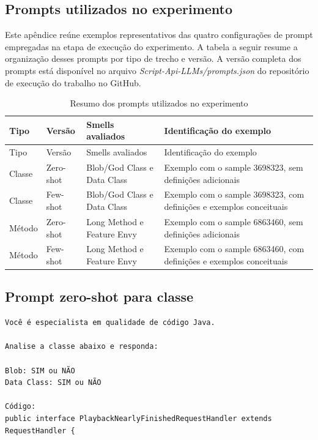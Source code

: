 \begin{apendicesenv}

\chapter{Prompts utilizados no experimento}
\label{ap:prompts-execucao}

Este apêndice reúne exemplos representativos das quatro configurações de prompt empregadas na etapa de execução do experimento. A tabela a seguir resume a organização desses prompts por tipo de trecho e versão. A versão completa dos prompts está disponível no arquivo \textit{Script-Api-LLMs/prompts.json} do repositório de execução do trabalho no GitHub.

\begin{longtable}{p{} p{} p{} p{}}
\caption{Resumo dos prompts utilizados no experimento}\label{tab:resumo-prompts}\\
\hline
Tipo & Versão & Smells avaliados & Identificação do exemplo \\
\hline
\endfirsthead
\hline
Tipo & Versão & Smells avaliados & Identificação do exemplo \\
\hline
\endhead
Classe & Zero-shot & Blob/God Class e Data Class & Exemplo com o sample 3698323, sem definições adicionais \\
Classe & Few-shot & Blob/God Class e Data Class & Exemplo com o sample 3698323, com definições e exemplos conceituais \\
Método & Zero-shot & Long Method e Feature Envy & Exemplo com o sample 6863460, sem definições adicionais \\
Método & Few-shot & Long Method e Feature Envy & Exemplo com o sample 6863460, com definições e exemplos conceituais \\
\hline
\end{longtable}

\section{Prompt zero-shot para classe}

\begin{verbatim}
Você é especialista em qualidade de código Java.

Analise a classe abaixo e responda:

Blob: SIM ou NÃO
Data Class: SIM ou NÃO

Código:
public interface PlaybackNearlyFinishedRequestHandler extends RequestHandler {


\end{verbatim}
\end{apendicesenv}
